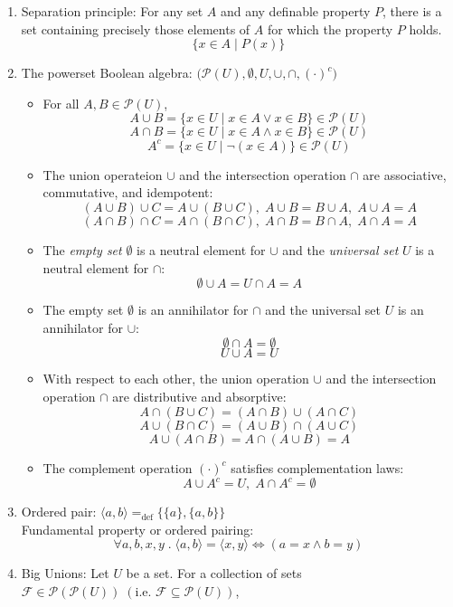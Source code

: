\documentclass{article}
\begin{document}
\begin{enumerate}
    \item Separation principle: For any set $A$ and any definable property $P$, there is a set containing precisely those elements of $A$ for which the property $P$ holds.
        $$\{x\in A\;|\;P(x)\}$$
    \item The powerset Boolean algebra: $\big(\mathcal{P}(U), \emptyset, U, \cup, \cap, (\cdot)^c\big)$
        \begin{itemize}[label={-},topsep=0pt]
            \item For all $A, B\in\mathcal{P}(U)$,
                $$A\cup B=\{x\in U\;|\;x\in A\vee x\in B\}\in\mathcal{P}(U)$$
                $$A\cap B=\{x\in U\;|\;x\in A\wedge x\in B\}\in\mathcal{P}(U)$$
                $$A^c=\{x\in U\;|\;\neg(x\in A)\}\in\mathcal{P}(U)$$
            \item The union operateion $\cup$ and the intersection operation $\cap$ are associative, commutative, and idempotent:
                $$(A\cup B)\cup C=A\cup(B\cup C),\;A\cup B=B\cup A,\;A\cup A=A$$
                $$(A\cap B)\cap C=A\cap(B\cap C),\;A\cap B=B\cap A,\;A\cap A=A$$
            \item The \textit{empty set} $\emptyset$ is a neutral element for $\cup$ and the \textit{universal set} $U$ is a neutral element for $\cap$:
                $$\emptyset\cup A=U\cap A=A$$
            \item The empty set $\emptyset$ is an annihilator for $\cap$ and the universal set $U$ is an annihilator for $\cup$:
                $$\emptyset\cap A=\emptyset$$
                $$U\cup A=U$$
            \item With respect to each other, the union operation $\cup$ and the intersection operation $\cap$ are distributive and absorptive:
                $$A\cap(B\cup C)=(A\cap B)\cup(A\cap C)$$
                $$A\cup(B\cap C)=(A\cup B)\cap(A\cup C)$$
                $$A\cup(A\cap B)=A\cap(A\cup B)=A$$
            \item The complement operation $(\cdot)^c$ satisfies complementation laws:
                $$A\cup A^c=U,\;A\cap A^c=\emptyset$$
        \end{itemize}
    \item Ordered pair: $\langle a, b\rangle=_{\text{def}}\big\{\{a\},\{a, b\}\big\}$\\
    Fundamental property or ordered pairing: 
        $$\forall a,b,x,y\;.\;\langle a,b\rangle=\langle x,y\rangle\Longleftrightarrow(a=x\wedge b=y)$$
    \item Big Unions: Let $U$ be a set. For a collection of sets $\mathcal{F}\in\mathcal{P}(\mathcal{P}(U))\;(\text{i.e. }\mathcal{F}\subseteq\mathcal{P}(U))$, 

\end{enumerate}
\end{document}
